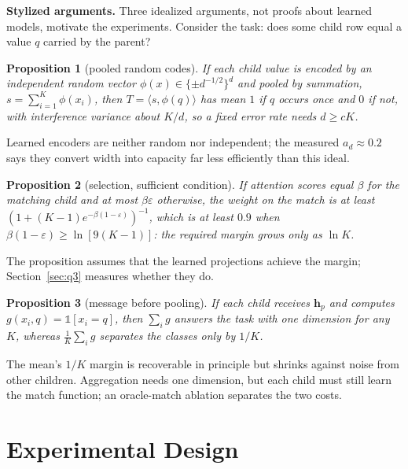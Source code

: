 \documentclass[conference]{IEEEtran}
\newtheorem{proposition}{Proposition}
\begin{document}
\textbf{Stylized arguments.} Three idealized arguments, not proofs about learned models, motivate the experiments. Consider the task: does some child row equal a value $q$ carried by the parent?

\begin{proposition}[pooled random codes]
If each child value is encoded by an independent random vector $\phi(x) \in \{\pm d^{-1/2}\}^d$ and pooled by summation, $s = \sum_{i=1}^K \phi(x_i)$, then $T = \langle s, \phi(q)\rangle$ has mean $1$ if $q$ occurs once and $0$ if not, with interference variance about $K/d$, so a fixed error rate needs $d \ge c K$.
\end{proposition}
\noindent Learned encoders are neither random nor independent; the measured $a_d \approx 0.2$ says they convert width into capacity far less efficiently than this ideal.

\begin{proposition}[selection, sufficient condition]
If attention scores equal $\beta$ for the matching child and at most $\beta\varepsilon$ otherwise, the weight on the match is at least $(1 + (K-1)e^{-\beta(1-\varepsilon)})^{-1}$, which is at least $0.9$ when $\beta(1-\varepsilon) \ge \ln[9(K-1)]$: the required margin grows only as $\ln K$.
\end{proposition}
\noindent The proposition assumes that the learned projections achieve the margin; Section~\ref{sec:q3} measures whether they do.

\begin{proposition}[message before pooling]
If each child receives $\mathbf{h}_p$ and computes $g(x_i, q) = \mathbb{1}[x_i = q]$, then $\sum_i g$ answers the task with one dimension for any $K$, whereas $\frac{1}{K}\sum_i g$ separates the classes only by $1/K$.
\end{proposition}
\noindent The mean's $1/K$ margin is recoverable in principle but shrinks against noise from other children. Aggregation needs one dimension, but each child must still learn the match function; an oracle-match ablation separates the two costs.

\section{Experimental Design}
\label{sec:design}
\end{document}
